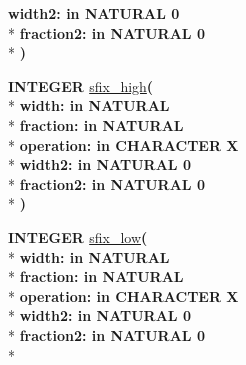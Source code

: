 \begin{DoxyCompactItemize}
{\bfseries \textcolor{vhdlchar}{width2\+: }\textcolor{stringliteral}{in }\textcolor{vhdlchar}{N\+A\+T\+U\+R\+A\+L   0}}\\*
{\bfseries \textcolor{vhdlchar}{fraction2\+: }\textcolor{stringliteral}{in }\textcolor{vhdlchar}{N\+A\+T\+U\+R\+A\+L   0}}\\*
{\bfseries  )} 
\item 
{\bfseries {\bfseries \textcolor{comment}{I\+N\+T\+E\+G\+E\+R}\textcolor{vhdlchar}{ }}} \hyperlink{class__fixed__pkg_ad91e017ea4ccf9f98f6e2d94e3851703}{sfix\+\_\+high}{\bfseries  ( }\\*
{\bfseries \textcolor{vhdlchar}{width\+: }\textcolor{stringliteral}{in }{\bfseries \textcolor{comment}{N\+A\+T\+U\+R\+A\+L}\textcolor{vhdlchar}{ }}}\\*
{\bfseries \textcolor{vhdlchar}{fraction\+: }\textcolor{stringliteral}{in }{\bfseries \textcolor{comment}{N\+A\+T\+U\+R\+A\+L}\textcolor{vhdlchar}{ }}}\\*
{\bfseries \textcolor{vhdlchar}{operation\+: }\textcolor{stringliteral}{in }\textcolor{vhdlchar}{C\+H\+A\+R\+A\+C\+T\+E\+R   \textquotesingle{}\+X\textquotesingle{}}}\\*
{\bfseries \textcolor{vhdlchar}{width2\+: }\textcolor{stringliteral}{in }\textcolor{vhdlchar}{N\+A\+T\+U\+R\+A\+L   0}}\\*
{\bfseries \textcolor{vhdlchar}{fraction2\+: }\textcolor{stringliteral}{in }\textcolor{vhdlchar}{N\+A\+T\+U\+R\+A\+L   0}}\\*
{\bfseries  )} 
\item 
{\bfseries {\bfseries \textcolor{comment}{I\+N\+T\+E\+G\+E\+R}\textcolor{vhdlchar}{ }}} \hyperlink{class__fixed__pkg_a6b051b7a5ea206111a4cf9433ab9658a}{sfix\+\_\+low}{\bfseries  ( }\\*
{\bfseries \textcolor{vhdlchar}{width\+: }\textcolor{stringliteral}{in }{\bfseries \textcolor{comment}{N\+A\+T\+U\+R\+A\+L}\textcolor{vhdlchar}{ }}}\\*
{\bfseries \textcolor{vhdlchar}{fraction\+: }\textcolor{stringliteral}{in }{\bfseries \textcolor{comment}{N\+A\+T\+U\+R\+A\+L}\textcolor{vhdlchar}{ }}}\\*
{\bfseries \textcolor{vhdlchar}{operation\+: }\textcolor{stringliteral}{in }\textcolor{vhdlchar}{C\+H\+A\+R\+A\+C\+T\+E\+R   \textquotesingle{}\+X\textquotesingle{}}}\\*
{\bfseries \textcolor{vhdlchar}{width2\+: }\textcolor{stringliteral}{in }\textcolor{vhdlchar}{N\+A\+T\+U\+R\+A\+L   0}}\\*
{\bfseries \textcolor{vhdlchar}{fraction2\+: }\textcolor{stringliteral}{in }\textcolor{vhdlchar}{N\+A\+T\+U\+R\+A\+L   0}}\\*

\end{DoxyCompactItemize}
